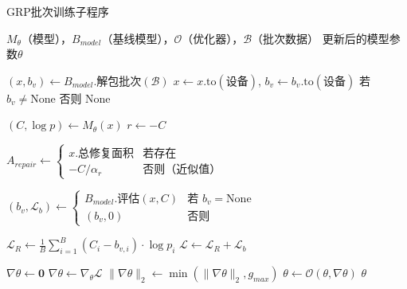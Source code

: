 \documentclass[AutoFakeBold]{LZUThesis}
\begin{document}
\begin{algorithm}[H]
	\begin{algorithmic}[1]
		\caption{GRP批次训练子程序}
		\label{alg:grp_batch_training}
		\Require $M_{\theta}$（模型），$B_{model}$（基线模型），$\mathcal{O}$（优化器），$\mathcal{B}$（批次数据）
		\Ensure 更新后的模型参数$\theta$

		\State $(x, b_v) \leftarrow B_{model}.\text{解包批次}(\mathcal{B})$
		\State $x \leftarrow x.\text{to}(\text{设备})$, $b_v \leftarrow b_v.\text{to}(\text{设备})$ 若 $b_v \neq \text{None}$ 否则 $\text{None}$

		\State $(C, \log p) \leftarrow M_{\theta}(x)$ 
		\State $r \leftarrow -C$ 

		\State $A_{repair} \leftarrow \begin{cases}
				x.\text{总修复面积} & \text{若存在}                 \\
				-C / \alpha_{r}              & \text{否则（近似值）}
			\end{cases}$
		\EndIf

		\State $(b_v, \mathcal{L}_{b}) \leftarrow \begin{cases}
				B_{model}.\text{评估}(x, C) & \text{若 } b_v = \text{None} \\
				(b_v, 0)                    & \text{否则}
			\end{cases}$

		\State $\mathcal{L}_{R} \leftarrow \frac{1}{B}\sum_{i=1}^{B}(C_i - b_{v,i}) \cdot \log p_i$
		\State $\mathcal{L} \leftarrow \mathcal{L}_{R} + \mathcal{L}_{b}$ 

		\State $\nabla\theta \leftarrow \mathbf{0}$ 
		\State $\nabla\theta \leftarrow \nabla_{\theta}\mathcal{L}$ 
		\State $\|\nabla\theta\|_2 \leftarrow \min(\|\nabla\theta\|_2, g_{max})$ 
		\State $\theta \leftarrow \mathcal{O}(\theta, \nabla\theta)$ 
		\State \Return $\theta$
	\end{algorithmic}
\end{algorithm}
\end{document}
